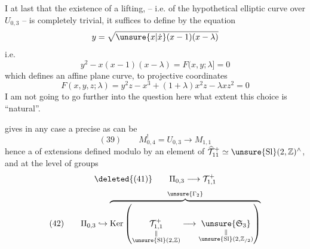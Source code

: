 I  at last that the existence of a  lifting, -- i.e. of the hypothetical elliptic curve over $U_{0,3}$ -- is completely trivial, it suffices to define  by the equation
\[
y=\sqrt{\unsure{x|\dot x}(x-1)(x-\lambda)}
\]
i.e.
\[
y^2-x(x-1)(x-\lambda)=F(x,y;\lambda]=0
\]
which defines an affine plane curve,
 to projective coordinates
\[
F(x,y,z;\lambda)=y^2z-x^3+(1+\lambda)x^2z-\lambda xz^2=0
\]
 I am not going to go further into the question here  what extent this choice is ``natural''.

  gives in any case a   precise as can be
\[
(39)\qquad M_{0,4}^{!}=U_{0,3}\longrightarrow M_{1,1}
\]
hence a  of extensions
defined modulo   by  an element of $\widehat{\mathcal T}_{11}^{+}\simeq\unsure{\mathrm{Sl}}(2,\mathbb Z)^{\wedge}$, and at the level of  groups
\[
\deleted{(41)}\qquad \Pi_{0,3}\longrightarrow\mathcal T_{1,1}^{+}
\]
\[
(42)\qquad \Pi_{0,3}\hookrightarrow
\overbrace{\operatorname{Ker}\left(
\underset{\substack{\Vert\\\unsure{\mathrm{Sl}}(2,\mathbb Z)}}{\mathcal T_{1,1}^{+}}
\longrightarrow
\underset{\substack{\Vert\\\unsure{\mathrm{Sl}}(2,\mathbb Z_{/2})}}{\unsure{\mathfrak S_3}}
\right)}^{\unsure{\Gamma_2}}
\]
